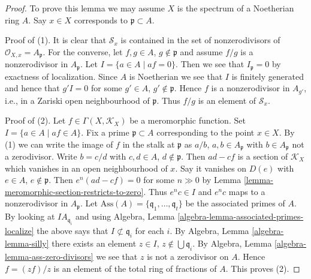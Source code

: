 \documentclass[10pt,a4paper]{amsart}
\theoremstyle{plain}
\theoremstyle{definition}
\theoremstyle{remark}
\numberwithin{equation}{subsection}
\begin{document}
\begin{proof}
To prove this lemma we may assume $X$ is the spectrum of a Noetherian
ring $A$. Say $x \in X$ corresponds to $\mathfrak p \subset A$.

\medskip\noindent
Proof of (1). It is clear that $\mathcal{S}_x$ is contained
in the set of nonzerodivisors of $\mathcal{O}_{X, x} = A_\mathfrak p$.
For the converse, let $f, g \in A$, $g \not \in \mathfrak p$ and
assume $f/g$ is a nonzerodivisor in $A_{\mathfrak p}$. Let
$I = \{a \in A \mid af = 0\}$. Then we see that $I_{\mathfrak p} = 0$ by
exactness of localization. Since $A$ is Noetherian we see that $I$
is finitely generated and hence that $g'I = 0$ for some $g' \in A$,
$g' \not \in \mathfrak p$. Hence $f$ is a nonzerodivisor
in $A_{g'}$, i.e., in a Zariski open neighbourhood of $\mathfrak p$.
Thus $f/g$ is an element of $\mathcal{S}_x$.

\medskip\noindent
Proof of (2). Let $f \in \Gamma(X, \mathcal{K}_X)$ be a meromorphic function.
Set $I = \{a \in A \mid af \in A\}$. Fix a prime $\mathfrak p \subset A$
corresponding to the point $x \in X$. By (1) we can write the image of $f$
in the stalk at $\mathfrak p$ as $a/b$, $a, b \in A_{\mathfrak p}$ with
$b \in A_{\mathfrak p}$ not a zerodivisor. Write $b = c/d$ with
$c, d \in A$, $d \not \in \mathfrak p$. Then $ad - cf$ is a section of
$\mathcal{K}_X$ which vanishes in an open neighbourhood of $x$. Say it
vanishes on $D(e)$ with $e \in A$, $e \not \in \mathfrak p$. Then
$e^n(ad - cf) = 0$ for some $n \gg 0$ by
Lemma \ref{lemma-meromorphic-section-restricts-to-zero}.
Thus $e^nc \in I$ and $e^nc$ maps to a nonzerodivisor in
$A_{\mathfrak p}$. Let
$\text{Ass}(A) = \{\mathfrak q_1, \ldots, \mathfrak q_t\}$ be the
associated primes of $A$. By looking at $IA_{\mathfrak q_i}$ and
using Algebra, Lemma \ref{algebra-lemma-associated-primes-localize}
the above says that
$I \not \subset \mathfrak q_i$ for each $i$. By
Algebra, Lemma \ref{algebra-lemma-silly}
there exists an element $z \in I$, $z \not \in \bigcup \mathfrak q_i$.
By Algebra, Lemma \ref{algebra-lemma-ass-zero-divisors}
we see that $z$ is not a zerodivisor on $A$.
Hence $f = (zf)/z$ is an element of the total ring of fractions of $A$.
This proves (2).
\end{proof}
\end{document}
